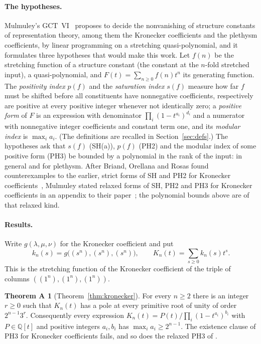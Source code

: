 \documentclass[11pt,a4paper]{article}
\theoremstyle{definition}
\newtheorem*{thmA}{Theorem A}
\newcommand{\Q}{\mathbb{Q}}
\begin{document}
\paragraph{The hypotheses.}
Mulmuley's GCT~VI~\cite{GCT6} proposes to decide the nonvanishing of
structure constants of representation theory, among them the Kronecker
coefficients and the plethysm coefficients, by linear programming on a
stretching quasi-polynomial, and it formulates three hypotheses that would
make this work. Let $f(n)$ be the stretching function of a structure constant
(the constant at the $n$-fold stretched input), a quasi-polynomial, and
$F(t)=\sum_{n\ge0}f(n)t^n$ its generating function. The \emph{positivity
index} $p(f)$ and the \emph{saturation index} $s(f)$ measure how far $f$ must
be shifted before all constituents have nonnegative coefficients, respectively
are positive at every positive integer whenever not identically zero; a
\emph{positive form} of $F$ is an expression with denominator
$\prod_i(1-t^{a_i})^{d_i}$ and a numerator with nonnegative integer
coefficients and constant term one, and its \emph{modular index} is
$\max_ia_i$. (The definitions are recalled in Section~\ref{sec:defs}.) The
hypotheses ask that $s(f)$ (SH(a)), $p(f)$ (PH2) and the modular index of some
positive form (PH3) be bounded by a polynomial in the rank of the input:
\cite[Hypotheses 3.3.2(a), 3.3.3, 3.3.4, p.~51]{GCT6} in general and
\cite[Hypotheses 1.6.5(a), 1.6.6, 1.6.7, pp.~24--25]{GCT6} for plethysm.
After Briand, Orellana and Rosas found counterexamples to the earlier, strict
forms of SH and PH2 for Kronecker coefficients~\cite{BOR}, Mulmuley stated
relaxed forms of SH, PH2 and PH3 for Kronecker coefficients in an appendix to
their paper~\cite[Appendix, pp.~18--20]{BOR}; the polynomial bounds above are
of that relaxed kind.

\paragraph{Results.}
Write $g(\lambda,\mu,\nu)$ for the Kronecker coefficient and put
\[
 k_n(s)=g\bigl((s^n),(s^n),(s^n)\bigr),\qquad
 K_n(t)=\sum_{s\ge0}k_n(s)t^s .
\]
This is the stretching function of the Kronecker coefficient of the triple of
columns $((1^n),(1^n),(1^n))$.

\begin{thmA}[Theorem~\ref{thm:kronecker}]
For every $n\ge2$ there is an integer $r\ge0$ such that $K_n(t)$ has a pole at
every primitive root of unity of order $2^{n-1}3^r$. Consequently every
expression $K_n(t)=P(t)/\prod_i(1-t^{a_i})^{b_i}$ with $P\in\Q[t]$ and
positive integers $a_i,b_i$ has $\max_ia_i\ge2^{n-1}$. The existence clause of
PH3 for Kronecker coefficients \cite[Hypothesis 3.3.4]{GCT6} fails, and so
does the relaxed PH3 of \cite[Appendix]{BOR}.
\end{thmA}
\end{document}
